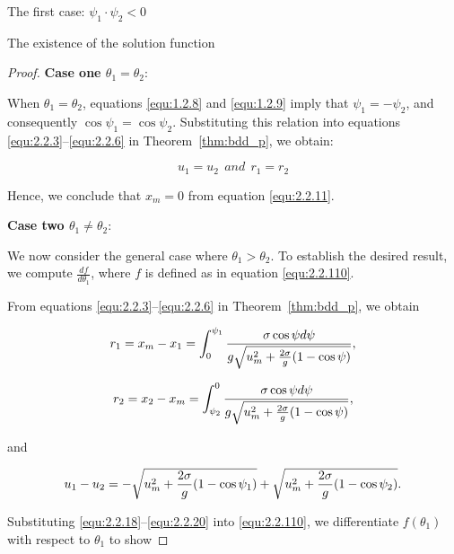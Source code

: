 \documentclass[letterpaper,reqno,10pt,twoside]{amsart}
\theoremstyle{definition}
\theoremstyle{remark}
\begin{document}
\begin{section}{The first case: $\psi_1\cdot \psi_2<0$ }
\begin{subsection}{The existence of the solution function}
\begin{proof}
    \textbf{Case one $\theta_1=\theta_2$}: 

     When $\theta_1=\theta_2$, equations \eqref{equ:1.2.8} and \eqref{equ:1.2.9} imply that $\psi_1=-\psi_2$, and consequently $\cos\psi_{1}=\cos\psi_{2}$. Substituting this relation into equations \eqref{equ:2.2.3}–\eqref{equ:2.2.6} in Theorem~\ref{thm:bdd_p}, we obtain:

    \begin{equation*}
        u_1=u_2~~and~~r_1=r_2
    \end{equation*}

    \noindent Hence, we conclude that $x_m=0$ from equation \eqref{equ:2.2.11}. 

    \textbf{Case two $\theta_1\neq \theta_2$}: 
    
    We now consider the general case where $\theta_1>\theta_2$. To establish the desired result, we compute $\frac{df}{d\theta_{1}}$, where $f$ is defined as in equation \eqref{equ:2.2.110}.

    From equations \eqref{equ:2.2.3}–\eqref{equ:2.2.6} in Theorem~\ref{thm:bdd_p}, we obtain

        \begin{equation}{\label{equ:2.2.18}}
            r_{1}=x_m-x_1=\int_{0}^{\psi_1}\frac{\sigma\cos\psi d\psi}{g\sqrt{u_{m}^{2}+\frac{2\sigma}{g}(1-\cos\psi)}},
        \end{equation}

        \begin{equation}{\label{equ:2.2.19}}
            r_{2}=x_2-x_m=\int_{\psi_2}^{0}\frac{\sigma\cos\psi d\psi}{g\sqrt{u_{m}^{2}+\frac{2\sigma }{g}(1-\cos\psi)}},
        \end{equation}

        \noindent and

        \begin{equation}{\label{equ:2.2.20}}
            u_1-u_2=-\sqrt{u_{m}^{2}+\frac{2\sigma}{g}(1-\cos\psi_{1})}+\sqrt{u_{m}^{2}+\frac{2\sigma}{g}(1-\cos\psi_{2})}.
        \end{equation}

        \noindent  Substituting \eqref{equ:2.2.18}–\eqref{equ:2.2.20} into \eqref{equ:2.2.110}, we differentiate $f(\theta_{1})$ with respect to $\theta_{1}$ to show


\end{proof}
\end{subsection}
\end{section}
\end{document}
